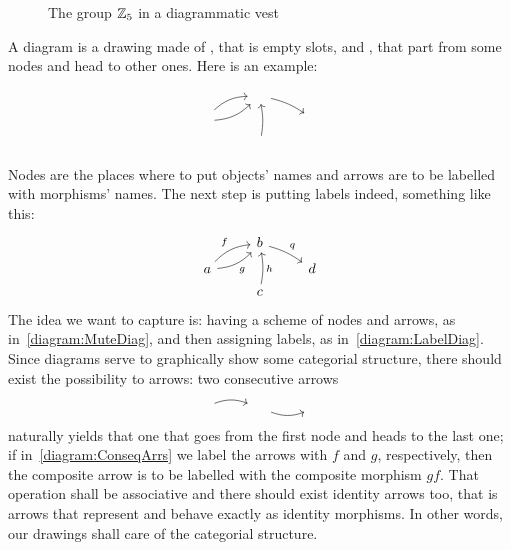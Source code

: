 \begin{figure}
  \centering 
  \caption{The group \(\mathbb Z_5\) in a diagrammatic vest}
\end{figure}

A diagram is a drawing made of , that is empty slots, and
, that part from some nodes and head to other ones. Here is
an example:
\begin{equation}\begin{tikzcd}[row sep=tiny]
    & \phantom\square \ar[dr, bend left=10] \\
    \phantom\square \ar[ur, bend left=20] \ar[ur, bend right=20, swap] & & \phantom\square  \\
    & \phantom\square \ar[uu, bend right=10, swap]
  \end{tikzcd}\label{diagram:MuteDiag}\end{equation}
%
Nodes are the places where to put objects' names and arrows are to be
labelled with morphisms' names. The next step is putting labels
indeed, something like this:
\begin{equation}\begin{tikzcd}[row sep=tiny]
    & b \ar["q", dr, bend left=10] \\
    a \arrow["f", ur, bend left=20] \arrow["g", ur, bend right=20, swap] & & d  \\
    & c \arrow["h", uu, bend right=10, swap]
  \end{tikzcd}\label{diagram:LabelDiag}\end{equation}
%
The idea we want to capture is: having a scheme of nodes and arrows,
as in~\eqref{diagram:MuteDiag}, and then assigning labels, as
in~\eqref{diagram:LabelDiag}. Since diagrams serve to graphically show
some categorial structure, there should exist the possibility to
 arrows: two consecutive arrows
\begin{equation}\begin{tikzcd}
    \phantom\square \ar[r, bend left=20] & \phantom\square \ar[r,
    swap, bend right=20] & \phantom\square
  \end{tikzcd}\label{diagram:ConseqArrs}\end{equation}
naturally yields that one that goes from the first node and heads to
the last one; if in~\eqref{diagram:ConseqArrs} we label the arrows
with \(f\) and \(g\), respectively, then the composite arrow is to be
labelled with the composite morphism \(gf\). That operation shall be
associative and there should exist identity arrows too, that is arrows
that represent and behave exactly as identity morphisms. In other
words, our drawings shall care of the categorial structure.

